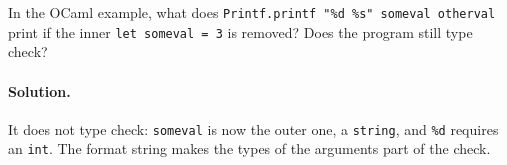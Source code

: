 \begin{exercise}
In the OCaml example, what does \texttt{Printf.printf "\%d \%s" someval otherval}
print if the inner \texttt{let someval = 3} is removed? Does the program still
type check?
\end{exercise}

\paragraph{Solution.} It does not type check: \texttt{someval} is now the outer
one, a \texttt{string}, and \texttt{\%d} requires an \texttt{int}. The format
string makes the types of the arguments part of the check.
